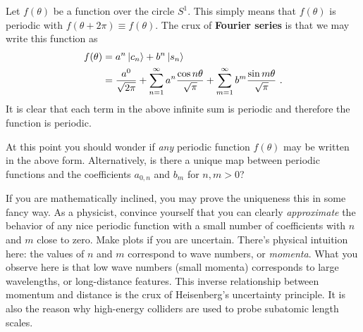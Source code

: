 \documentclass[12pt, oneside]{report}    %
\begin{document}
Let $f(\theta)$ be a function over the circle $S^1$. This simply means that $f(\theta)$ is periodic with $f(\theta+2\pi) \equiv f(\theta)$. The crux of \textbf{Fourier series} is that we may write this function as
\begin{align}
    f(\theta) 
    &= a^n\left|c_n\right\rangle
    + 
    b^n \left|s_n\right\rangle
    \\
    &= 
    \frac{a^0}{\sqrt{2\pi}}
    +
    \sum_{n=1}^\infty a^n \frac{\cos n\theta}{\sqrt{\pi}}
    + \sum_{m=1}^\infty b^m \frac{\sin m\theta}{\sqrt{\pi}} \ .
    \label{eq:fourier:series:sine:cos}
\end{align}
It is clear that each term in the above infinite sum is periodic and therefore the function is periodic.
\begin{exercise}[Completeness?] 
At this point you should wonder if \emph{any} periodic function $f(\theta)$ may be written in the above form. Alternatively, is there a unique map between periodic functions and the coefficients $a_{0,n}$ and $b_m$ for $n,m>0$? 

If you are mathematically inclined, you may prove the uniqueness this in some fancy way. As a physicist, convince yourself that you can clearly \emph{approximate} the behavior of any nice periodic function with a small number of coefficients with $n$ and $m$ close to zero. Make plots if you are uncertain. There's physical intuition here: the values of $n$ and $m$ correspond to wave numbers, or \emph{momenta}. What you observe here is that low wave numbers (small momenta) corresponds to large wavelengths, or long-distance features. This inverse relationship between momentum and distance is the crux of Heisenberg's uncertainty principle. It is also the reason why high-energy colliders are used to probe subatomic length scales.
\end{exercise}
\end{document}
